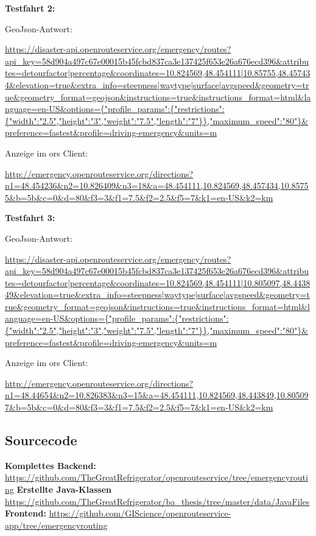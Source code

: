\textbf{Testfahrt 2:}

GeoJson-Antwort:\par
\url{https://disaster-api.openrouteservice.org/emergency/routes?api_key=58d904a497c67e00015b45fcbd837ca3e137425f653e26a676ecd396&attributes=detourfactor|percentage&coordinates=10.824569,48.454111|10.85755,48.457434&elevation=true&extra_info=steepness|waytype|surface|avgspeed&geometry=true&geometry_format=geojson&instructions=true&instructions_format=html&language=en-US&options={"profile_params":{"restrictions":{"width":"2.5","height":"3","weight":"7.5","length":"7"}},"maximum_speed":"80"}&preference=fastest\&profile=driving-emergency&units=m}
\medskip

Anzeige im \gls{ors} Client:\par
\url{http://emergency.openrouteservice.org/directions?n1=48.454236&n2=10.826409&n3=18&a=48.454111,10.824569,48.457434,10.85755&b=5b&c=0&d=80&f3=3&f1=7.5&f2=2.5&f5=7&k1=en-US&k2=km}
\medskip

\textbf{Testfahrt 3:}

GeoJson-Antwort:\par
\url{https://disaster-api.openrouteservice.org/emergency/routes?api_key=58d904a497c67e00015b45fcbd837ca3e137425f653e26a676ecd396&attributes=detourfactor|percentage&coordinates=10.824569,48.454111|10.805097,48.443849&elevation=true&extra_info=steepness|waytype|surface|avgspeed&geometry=true&geometry_format=geojson&instructions=true&instructions_format=html&language=en-US&options={"profile_params":{"restrictions":{"width":"2.5","height":"3","weight":"7.5","length":"7"}},"maximum_speed":"80"}&preference=fastest&profile=driving-emergency&units=m}
\medskip

Anzeige im \gls{ors} Client:\par
\url{http://emergency.openrouteservice.org/directions?n1=48.44654&n2=10.826383&n3=15&a=48.454111,10.824569,48.443849,10.805097&b=5b&c=0&d=80&f3=3&f1=7.5&f2=2.5&f5=7&k1=en-US&k2=km}
\medskip

\subsection*{Sourcecode}
\label{sec:source}

\sloppy
\textbf{Komplettes Backend:}\newline
\url{https://github.com/TheGreatRefrigerator/openrouteservice/tree/emergencyrouting}
\newline
\smallskip
\textbf{Erstellte Java-Klassen}\newline
\url{https://github.com/TheGreatRefrigerator/ba_thesis/tree/master/data/JavaFiles}
\newline
\medskip
\textbf{Frontend:}\newline
\url{https://github.com/GIScience/openrouteservice-app/tree/emergencyrouting}
\fussy

